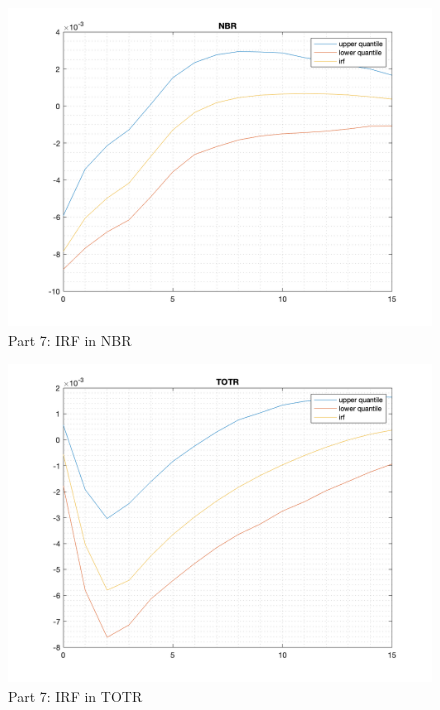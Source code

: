 \documentclass[10pt,letter]{article}
\begin{document}
\begin{figure}
\begin{center}
\includegraphics[width=15cm]{ps9fig5}
\caption{Part 7: IRF in NBR}
\end{center}
\end{figure}
\begin{figure}
\begin{center}
\includegraphics[width=15cm]{ps9fig6}
\caption{Part 7: IRF in TOTR}
\end{center}
\end{figure}
\end{document}
